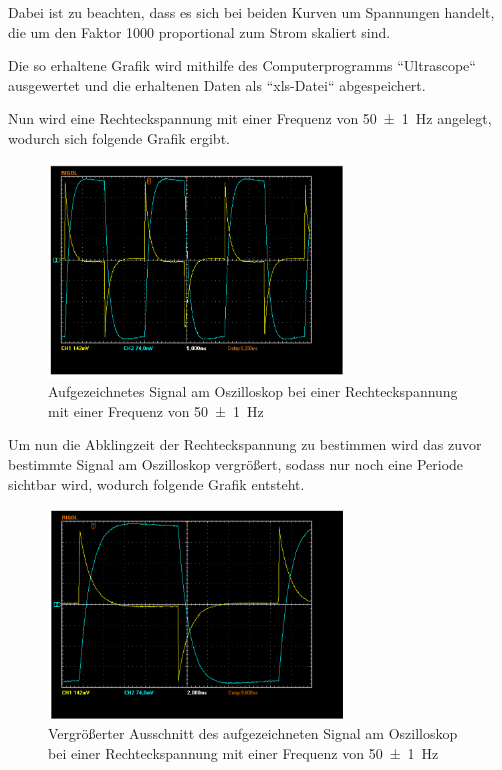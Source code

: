 \documentclass[11pt,ngerman]{scrartcl}
\begin{document}
Dabei ist zu beachten, dass es sich bei beiden Kurven um Spannungen handelt, die um den Faktor 1000 proportional zum Strom skaliert sind.

Die so erhaltene Grafik wird mithilfe des Computerprogramms ``Ultrascope`` ausgewertet und die erhaltenen Daten als ``xls-Datei`` abgespeichert.

\vspace{2mm}

Nun wird eine Rechteckspannung mit einer Frequenz von \SI{50(1)}{\hertz} angelegt, wodurch sich folgende Grafik ergibt.

\begin{figure}[H]
	\begin{center}
		\includegraphics[width=0.7\textwidth]{Bild_versuch2}
	\end{center}
	\caption{Aufgezeichnetes Signal am Oszilloskop bei einer Rechteckspannung mit einer Frequenz von \SI{50(1)}{\hertz}}
	\label{fig:rechteckschw}
\end{figure}

Um nun die Abklingzeit der Rechteckspannung zu bestimmen wird das zuvor bestimmte Signal am Oszilloskop vergrößert, sodass nur noch eine Periode sichtbar wird, wodurch folgende Grafik entsteht.

\begin{figure}[H]
	\begin{center}
		\includegraphics[width=0.7\textwidth]{Bild_versuch2_b}
	\end{center}
	\caption{Vergrößerter Ausschnitt des aufgezeichneten Signal am Oszilloskop bei einer Rechteckspannung mit einer Frequenz von \SI{50(1)}{\hertz}}
	\label{fig:rechteckschw_groß}
\end{figure}
\end{document}
